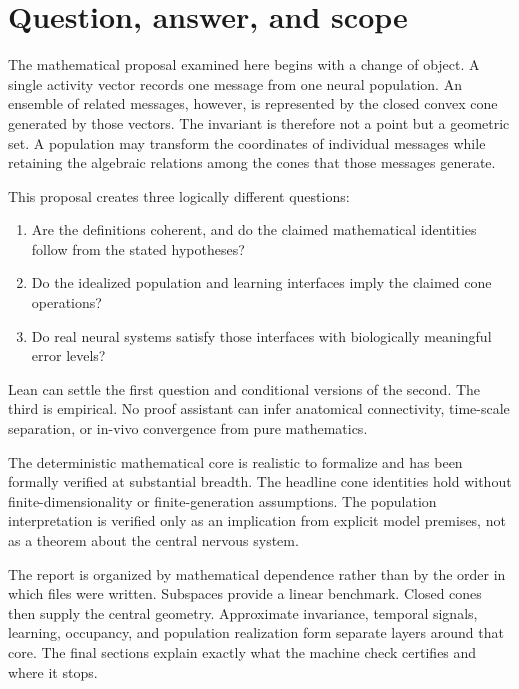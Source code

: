 \documentclass[11pt,a4paper]{article}
\begin{document}

\section{Question, answer, and scope}
\label{sec:introduction}

The mathematical proposal examined here begins with a change of object. A
single activity vector records one message from one neural population.
An ensemble of related messages, however, is represented by the closed convex
cone generated by those vectors. The invariant is therefore not a point but a
geometric set. A population may transform the coordinates of individual
messages while retaining the algebraic relations among the cones that those
messages generate.

This proposal creates three logically different questions:

\begin{enumerate}[label=\arabic*.]
  \item Are the definitions coherent, and do the claimed mathematical
    identities follow from the stated hypotheses?
  \item Do the idealized population and learning interfaces imply the claimed
    cone operations?
  \item Do real neural systems satisfy those interfaces with biologically
    meaningful error levels?
\end{enumerate}

Lean can settle the first question and conditional versions of the second.
The third is empirical. No proof assistant can infer anatomical connectivity,
time-scale separation, or in-vivo convergence from pure mathematics.

\begin{keyresult}
The deterministic mathematical core is realistic to formalize and has been
formally verified at substantial breadth. The headline cone identities hold
without finite-dimensionality or finite-generation assumptions. The
population interpretation is verified only as an implication from explicit
model premises, not as a theorem about the central nervous system.
\end{keyresult}

The report is organized by mathematical dependence rather than by the order
in which files were written. Subspaces provide a linear benchmark. Closed
cones then supply the central geometry. Approximate invariance, temporal
signals, learning, occupancy, and population realization form separate
layers around that core. The final sections explain exactly what the machine
check certifies and where it stops.
\end{document}
